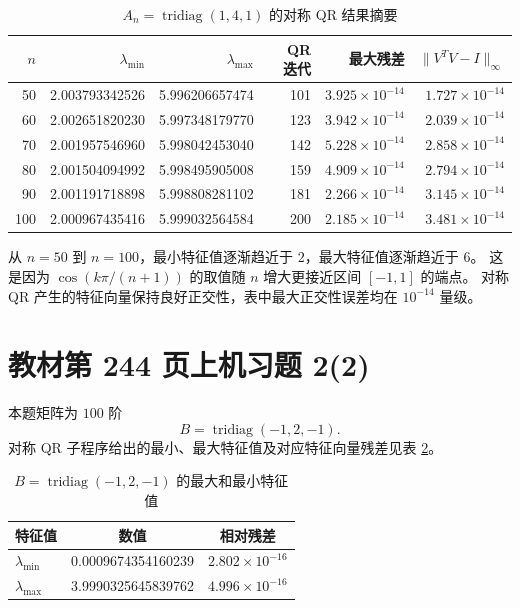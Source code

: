 \documentclass[a4paper,11pt]{article}
\begin{document}
\begin{table}[H]
\centering
\small
\caption{$A_n=\operatorname{tridiag}(1,4,1)$ 的对称 QR 结果摘要}
\label{tab:p244-1}
\begin{tabular}{rrrrrr}
\toprule
$n$ & $\lambda_{\min}$ & $\lambda_{\max}$ & QR 迭代 & 最大残差 & $\|V^TV-I\|_\infty$ \\
\midrule
50  & 2.003793342526 & 5.996206657474 & 101 & $3.925\times10^{-14}$ & $1.727\times10^{-14}$ \\
60  & 2.002651820230 & 5.997348179770 & 123 & $3.942\times10^{-14}$ & $2.039\times10^{-14}$ \\
70  & 2.001957546960 & 5.998042453040 & 142 & $5.228\times10^{-14}$ & $2.858\times10^{-14}$ \\
80  & 2.001504094992 & 5.998495905008 & 159 & $4.909\times10^{-14}$ & $2.794\times10^{-14}$ \\
90  & 2.001191718898 & 5.998808281102 & 181 & $2.266\times10^{-14}$ & $3.145\times10^{-14}$ \\
100 & 2.000967435416 & 5.999032564584 & 200 & $2.185\times10^{-14}$ & $3.481\times10^{-14}$ \\
\bottomrule
\end{tabular}
\end{table}

从 $n=50$ 到 $n=100$，最小特征值逐渐趋近于 $2$，最大特征值逐渐趋近于 $6$。
这是因为 $\cos(k\pi/(n+1))$ 的取值随 $n$ 增大更接近区间 $[-1,1]$ 的端点。
对称 QR 产生的特征向量保持良好正交性，表中最大正交性误差均在 $10^{-14}$ 量级。

\section{教材第 244 页上机习题 2(2)}
本题矩阵为 $100$ 阶
\[
    B=\operatorname{tridiag}(-1,2,-1).
\]
对称 QR 子程序给出的最小、最大特征值及对应特征向量残差见表 \ref{tab:p244-2}。

\begin{table}[H]
\centering
\caption{$B=\operatorname{tridiag}(-1,2,-1)$ 的最大和最小特征值}
\label{tab:p244-2}
\begin{tabular}{lcc}
\toprule
特征值 & 数值 & 相对残差 \\
\midrule
$\lambda_{\min}$ & 0.0009674354160239 & $2.802\times10^{-16}$ \\
$\lambda_{\max}$ & 3.9990325645839762 & $4.996\times10^{-16}$ \\
\bottomrule
\end{tabular}
\end{table}
\end{document}
